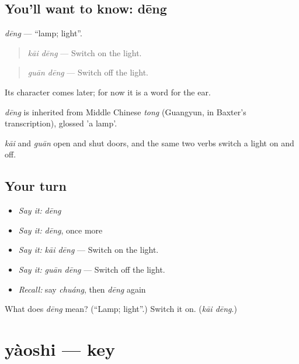 \subsection*{You'll want to know: dēng}
\emph{dēng} — \textquotedblleft{}lamp; light\textquotedblright{}.

\begin{quote}
\emph{kāi dēng} — Switch on the light.
\end{quote}

\begin{quote}
\emph{guān dēng} — Switch off the light.
\end{quote}

Its character comes later; for now it is a word for the ear.

\begin{cousinweb}
\emph{dēng} is inherited from Middle Chinese \emph{tong} (Guangyun, in Baxter's transcription), glossed 'a lamp'.
\end{cousinweb}

\begin{grammarlens}[title={What you've built}]
\emph{kāi} and \emph{guān} open and shut doors, and the same two verbs switch a light on and off.
\end{grammarlens}

\subsection*{Your turn}
\begin{itemize}
\raggedright
  \item \emph{Say it:} \emph{dēng}
  \item \emph{Say it:} \emph{dēng}, once more
  \item \emph{Say it:} \emph{kāi dēng} — Switch on the light.
  \item \emph{Say it:} \emph{guān dēng} — Switch off the light.
  \item \emph{Recall:} say \emph{chuáng}, then \emph{dēng} again
\end{itemize}

\begin{tcolorbox}[breakable,colback=teal!4,colframe=teal!35!black,title={Before you move on}]
What does \emph{dēng} mean? (\textquotedblleft{}Lamp; light\textquotedblright{}.) Switch it on. (\emph{kāi dēng}.)
\end{tcolorbox}
\section[yàoshi]{yàoshi — key}


